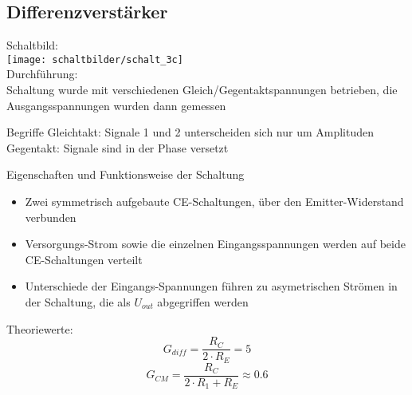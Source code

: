 \documentclass[compress,11pt]{beamer}
\begin{document}
\subsection{Differenzverstärker}
\begin{frame}
Schaltbild:\\

\texttt{[image: schaltbilder/schalt\_3c]}\\
Durchführung:\\
Schaltung wurde mit verschiedenen Gleich/Gegentaktspannungen betrieben, die Ausgangsspannungen wurden dann gemessen
\end{frame}
\begin{frame}
\begin{block}{Begriffe}
Gleichtakt: Signale 1 und 2 unterscheiden sich nur um Amplituden
Gegentakt: Signale sind in der Phase versetzt
\end{block}
\end{frame}
\begin{frame}
\begin{block}{Eigenschaften und Funktionsweise der Schaltung}
\begin{itemize}
\item Zwei symmetrisch aufgebaute CE-Schaltungen, über den Emitter-Widerstand verbunden
\item Versorgungs-Strom sowie die einzelnen Eingangsspannungen werden auf beide CE-Schaltungen verteilt
\item Unterschiede der Eingangs-Spannungen führen zu asymetrischen Strömen in der Schaltung, die als $U_{out}$ abgegriffen werden
\end{itemize}
\end{block}
\end{frame}
\begin{frame}
Theoriewerte:
\begin{equation}
G_{diff} = \frac{R_C}{2 \cdot R_E} = 5
\end{equation}
\begin{equation}
G_{CM} = \frac{R_C}{2 \cdot R_1 + R_E} \approx 0.6
\end{equation}
\end{frame}
\end{document}
